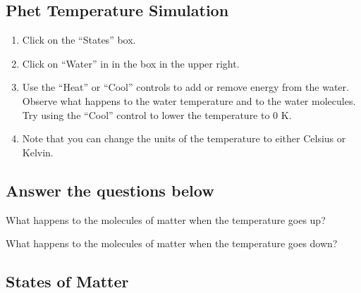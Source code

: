 \documentclass[12pt]{exam}
\begin{document}
\subsection{Phet Temperature Simulation}

\begin{enumerate}
  \item Click on the “States” box.
  \item Click on “Water” in in the box in the upper right.
  \item Use the “Heat” or “Cool” controls to add or remove energy from the water. Observe what happens to the water temperature and to the water molecules. Try using the “Cool” control to lower the temperature to 0 K.
  \item Note that you can change the units of the temperature to either Celsius or Kelvin.
\end{enumerate}

\subsection{Answer the questions below}

\begin{questions}
  \question What happens to the molecules of matter when the temperature goes up?

  \vspace{3cm}

  \question What happens to the molecules of matter when the temperature goes down?
\end{questions}

\pagebreak

\subsection{States of Matter}
\end{document}

